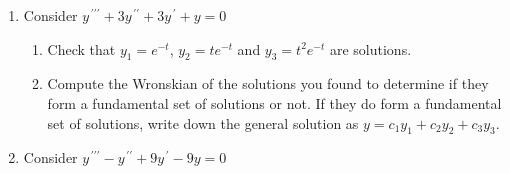 \documentclass{ximera}
\begin{document}
\begin{enumerate}
\begin{enumerate}
\end{enumerate}

\newpage

For a third-order linear homogeneous differential equation, we need three linearly independent solutions to form a fundamental set of solutions. In order to check the linear independence of a given set of solutions, we can compute the Wronskian:  The \textbf{Wronskian} of $f,g,h$ is

\[
W(x)=\left|\begin{array}{ccc} f & g & h\\ f' & g'  & h'\\ f'' & g'' & h''\end{array}\right| = f\left|\begin{array}{cc} g' & h'\\ g'' & h'' \end{array}\right|-g\left|\begin{array}{cc} f' & h'\\ f'' & h'' \end{array}\right| + h\left|\begin{array}{cc} f' & g'\\ f'' & g'' \end{array}\right|
\]

where the absolute value bars denote determinants.

\item Consider $y^{\,\prime\prime\prime}+3y^{\,\prime\prime}+3y^{\,\prime}+y=0$

\begin{enumerate}

\item Check that $y_{1}=e^{-t}$, $y_2=te^{-t}$ and $y_3=t^2e^{-t}$ are solutions.

\vfill



\vfill


\item Compute the Wronskian of the solutions you found to determine if they form a fundamental set of solutions or not.  If they do form a fundamental set of solutions, write down the general solution as $y=c_1y_1+c_2y_2+c_3y_3$.



\vfill


\end{enumerate}

\newpage

\item Consider $y^{\,\prime\prime\prime}-y^{\,\prime\prime}+9y^{\,\prime}-9y=0$


\end{enumerate}
\end{document}
